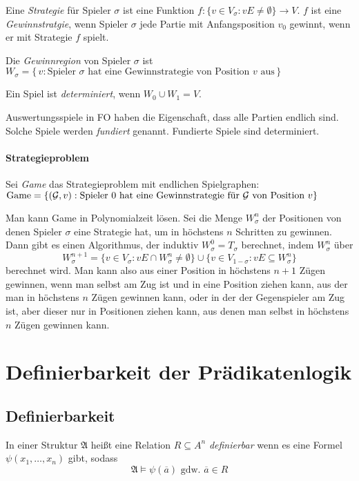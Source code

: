 \documentclass{panikzettel}
\newcommand{\A}{\mathfrak{A}}
\begin{document}
Eine \emph{Strategie} für Spieler $\sigma$ ist eine Funktion $f:\{v \in V_{\sigma}:vE \ne \emptyset \}\rightarrow V$. $f$ ist eine \emph{Gewinnstratgie}, wenn Spieler $\sigma$ jede Partie mit Anfangsposition $v_0$ gewinnt, wenn er mit Strategie $f$ spielt.

Die \emph{Gewinnregion} von Spieler $\sigma$ ist $W_{\sigma}=\{\,v:\text{Spieler $\sigma$ hat eine Gewinnstrategie von Position $v$ aus}\,\}$

Ein Spiel ist \emph{determiniert}, wenn $W_0 \cup W_1=V$.

Auswertungsspiele in FO haben die Eigenschaft, dass alle Partien endlich sind. Solche Spiele werden \emph{fundiert} genannt. Fundierte Spiele sind determiniert.

\paragraph{Strategieproblem}
Sei \emph{Game} das Strategieproblem mit endlichen Spielgraphen:
$\mathrm{Game}=\{(\mathcal{G},v):\textnormal{Spieler }0\textnormal{ hat eine Gewinnstrategie für }\mathcal{G}\textnormal{ von Position }v\}$

Man kann Game in Polynomialzeit lösen. Sei die Menge $W_{\sigma}^n$ der Positionen von denen Spieler $\sigma$ eine Strategie hat, um in höchstens $n$ Schritten zu gewinnen. Dann gibt es einen Algorithmus, der induktiv $W_{\sigma}^0=T_{\sigma}$ berechnet, indem $W_{\sigma}^n$ über
\[W_{\sigma}^{n+1}=\{v \in V_{\sigma}:vE \cap W_{\sigma}^n \ne \emptyset \} \cup \{v \in V_{1-\sigma}:vE \subseteq W_{\sigma}^n\}\]
berechnet wird. Man kann also aus einer Position in höchstens $n + 1$ Zügen gewinnen, wenn man selbst am Zug ist und in eine Position ziehen kann, aus der man in höchstens $n$ Zügen gewinnen kann, oder in der der Gegenspieler am Zug ist, aber dieser nur in Positionen ziehen kann, aus denen man selbst in höchstens $n$ Zügen gewinnen kann.

\section{Definierbarkeit der Prädikatenlogik}
\subsection{Definierbarkeit}
In einer Struktur $\A$ heißt eine Relation $R \subseteq A^n$ \emph{definierbar} wenn es eine Formel $\psi(x_1, \ldots, x_n)$ gibt, sodass
\[\A \models \psi(\overline{a}) \text{ gdw.\ } \overline{a} \in R\]
\end{document}
